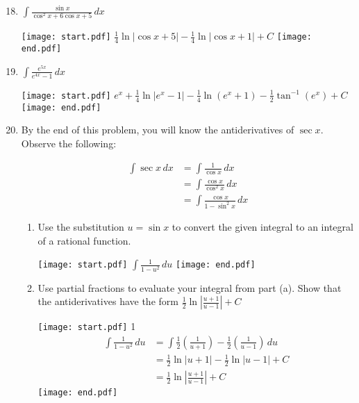 \documentclass[12pt]{article}
\begin{document}

\begin{enumerate}
\setcounter{enumi}{17}

\item $\int \frac{\sin{x}}{\cos^2{x}+6\cos{x}+5} \,dx$

\texttt{[image: start.pdf]}
{{$\frac{1}{4}\ln{|\cos{x}+5|}-\frac{1}{4}\ln{|\cos{x}+1|}+C$}}
\texttt{[image: end.pdf]}


\item $\int \frac{e^{5x}}{e^{4x}-1} \,dx$

\texttt{[image: start.pdf]}
{{$e^{x}+\frac{1}{4}\ln|e^x-1|-\frac{1}{4}\ln(e^x+1)-\frac{1}{2}\tan^{-1}(e^x)+C$}}
\texttt{[image: end.pdf]}


\newpage

\item By the end of this problem, you will know the antiderivatives of $\sec{x}$.  Observe the following:
\begin{center}
\begin{align*}
\int \sec{x} \,dx &= \int \frac{1}{\cos{x}} \,dx\\
&= \int \frac{\cos{x}}{\cos^2{x}} \,dx\\
&= \int \frac{\cos{x}}{1-\sin^2{x}} \,dx
\end{align*}
\end{center}
\begin{enumerate}

\item Use the substitution $u=\sin{x}$ to convert the given integral to an integral of a rational function.  

\texttt{[image: start.pdf]}
{{$\int \frac{1}{1-u^2} \,du$}}
\texttt{[image: end.pdf]}


\item Use partial fractions to evaluate your integral from part (a).  Show that the antiderivatives have the form $\frac{1}{2}\ln{\left|\frac{u+1}{u-1}\right|}+C$

\texttt{[image: start.pdf]}
{{{1\linewidth}{
\begin{align*}
\int \frac{1}{1-u^2}\,du &= \int \frac{1}{2}\left(\frac{1}{u+1}\right)-\frac{1}{2}\left(\frac{1}{u-1}\right) \,du\\
&=\frac{1}{2}\ln{|u+1|}-\frac{1}{2}\ln{|u-1|}+C\\
&=\frac{1}{2}\ln{\left|\frac{u+1}{u-1}\right|}+C
\end{align*}
}}}
\texttt{[image: end.pdf]}



\end{enumerate}
\end{enumerate}
\end{document}
